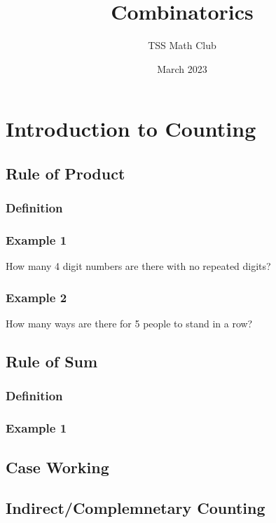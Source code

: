 \documentclass{article}
\title{Combinatorics}
\author{TSS Math Club}
\date{March 2023}
\begin{document}
\large

\maketitle

\section{Introduction to Counting}

\subsection{Rule of Product}
\subsubsection{Definition}
\vspace{20px}
\subsubsection{Example 1}
How many 4 digit numbers are there with no repeated digits?
\vspace{20px}
\subsubsection{Example 2}
How many ways are there for 5 people to stand in a row?
\vspace{20px}
\subsection{Rule of Sum}
\subsubsection{Definition}
\vspace{20px}
\subsubsection{Example 1}



\subsection{Case Working}

\subsection{Indirect/Complemnetary Counting}
\end{document}
